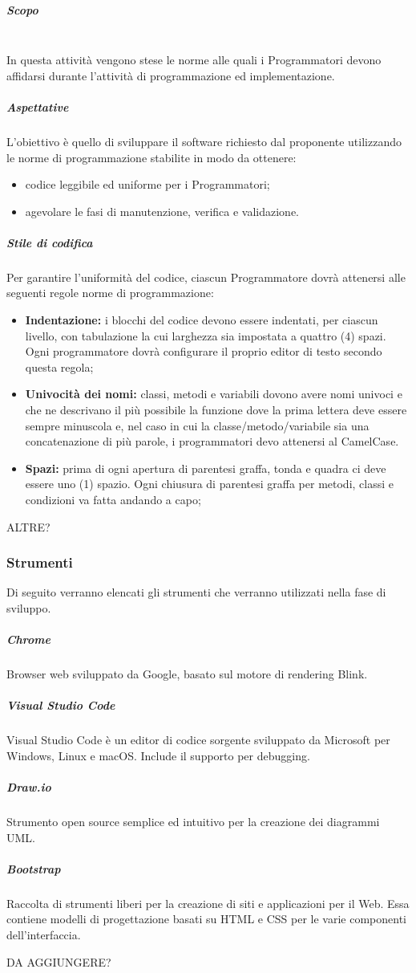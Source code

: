 				\subparagraph{Scopo \\ \\}	
					In questa attività vengono stese le norme alle quali i Programmatori devono affidarsi durante l’attività di  programmazione ed implementazione.
				\subparagraph{Aspettative}
					 L’obiettivo è quello di sviluppare il software richiesto dal proponente utilizzando le norme di programmazione stabilite in modo da ottenere:
					 	\begin{itemize}
					 	\item codice leggibile ed uniforme per i Programmatori;
					 	\item agevolare le fasi di manutenzione, verifica e validazione.
					 \end{itemize} 
				 \subparagraph{Stile di codifica}
				 	Per garantire l'uniformità del codice, ciascun Programmatore dovrà attenersi alle seguenti regole norme di programmazione: 
					\begin{itemize}
						\item \textbf{Indentazione:} i blocchi del codice devono essere indentati, per ciascun livello, con tabulazione la cui larghezza sia impostata a quattro (4) spazi. Ogni programmatore dovrà configurare il proprio editor di testo secondo questa regola;
						\item \textbf{Univocità dei nomi:} classi, metodi e variabili dovono avere nomi univoci e che ne descrivano il più possibile la funzione dove la prima lettera deve essere sempre minuscola e, nel caso in cui la classe/metodo/variabile sia una concatenazione di più parole, i programmatori devo attenersi al CamelCase.
						\item \textbf{Spazi:} prima di ogni apertura di parentesi graffa, tonda e quadra ci deve essere uno (1) spazio. Ogni chiusura di parentesi graffa per metodi, classi e condizioni va fatta andando a capo;
					\end{itemize}
					ALTRE?
					
				 
		\subsubsection{Strumenti}
			Di seguito verranno elencati gli strumenti che verranno utilizzati nella fase di sviluppo.
				\subparagraph{Chrome \\}
					Browser web sviluppato da Google, basato sul motore di rendering Blink.
				\subparagraph{Visual Studio Code \\}
					Visual Studio Code è un editor di codice sorgente sviluppato da Microsoft per Windows, Linux e macOS. Include il supporto per debugging.
				\subparagraph{Draw.io \\}
					Strumento open source semplice ed  intuitivo per la creazione dei diagrammi UML.
				\subparagraph{Bootstrap \\}
					Raccolta di strumenti liberi per la creazione di siti e applicazioni per il Web. Essa contiene modelli di progettazione basati su HTML e CSS per le varie componenti dell'interfaccia.
				
					DA AGGIUNGERE?
			